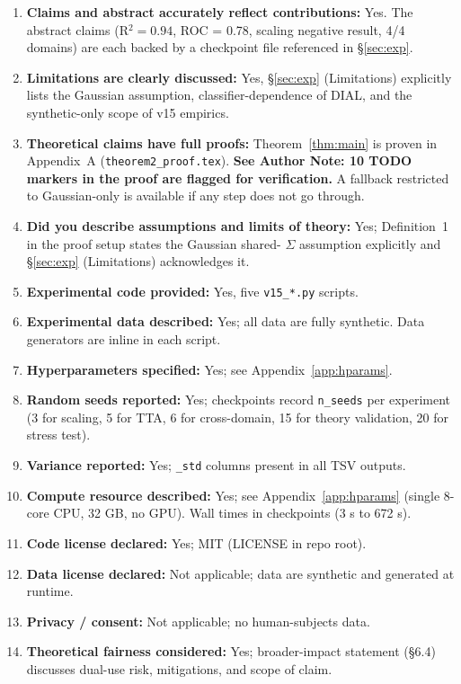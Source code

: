 \begin{enumerate}
\item \textbf{Claims and abstract accurately reflect contributions:}
  Yes. The abstract claims (R$^2 = 0.94$, ROC = 0.78, scaling
  negative result, 4/4 domains) are each backed by a checkpoint
  file referenced in \S\ref{sec:exp}.

\item \textbf{Limitations are clearly discussed:} Yes,
  \S\ref{sec:exp} (Limitations) explicitly lists the Gaussian
  assumption, classifier-dependence of DIAL, and the synthetic-only
  scope of v15 empirics.

\item \textbf{Theoretical claims have full proofs:} Theorem~\ref{thm:main}
  is proven in Appendix~A (\texttt{theorem2\_proof.tex}). \textbf{See
  Author Note: 10 TODO markers in the proof are flagged for
  verification.} A fallback restricted to Gaussian-only is
  available if any step does not go through.

\item \textbf{Did you describe assumptions and limits of theory:}
  Yes; Definition~1 in the proof setup states the Gaussian shared-
  $\Sigma$ assumption explicitly and \S\ref{sec:exp} (Limitations)
  acknowledges it.

\item \textbf{Experimental code provided:} Yes, five
  \texttt{v15\_*.py} scripts.

\item \textbf{Experimental data described:} Yes; all data are fully
  synthetic. Data generators are inline in each script.

\item \textbf{Hyperparameters specified:} Yes; see
  Appendix~\ref{app:hparams}.

\item \textbf{Random seeds reported:} Yes; checkpoints record
  \texttt{n\_seeds} per experiment (3 for scaling, 5 for TTA, 6 for
  cross-domain, 15 for theory validation, 20 for stress test).

\item \textbf{Variance reported:} Yes; \texttt{\_std} columns present
  in all TSV outputs.

\item \textbf{Compute resource described:} Yes; see
  Appendix~\ref{app:hparams} (single 8-core CPU, 32 GB, no GPU).
  Wall times in checkpoints (3 s to 672 s).

\item \textbf{Code license declared:} Yes; MIT (LICENSE in repo
  root).

\item \textbf{Data license declared:} Not applicable; data are
  synthetic and generated at runtime.

\item \textbf{Privacy / consent:} Not applicable; no human-subjects
  data.

\item \textbf{Theoretical fairness considered:} Yes; broader-impact
  statement (\S6.4) discusses dual-use risk, mitigations, and
  scope of claim.
\end{enumerate}


